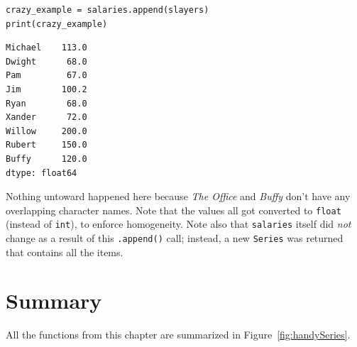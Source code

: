\begin{Verbatim}[fontsize=\small,samepage=true,frame=single,framesep=3mm]
crazy_example = salaries.append(slayers)
print(crazy_example)
\end{Verbatim}
\vspace{-.3in}

\begin{Verbatim}[fontsize=\small,samepage=true,frame=leftline,framesep=5mm,framerule=1mm]
Michael    113.0
Dwight      68.0
Pam         67.0
Jim        100.2
Ryan        68.0
Xander      72.0
Willow     200.0
Rubert     150.0
Buffy      120.0
dtype: float64
\end{Verbatim}


Nothing untoward happened here because \textit{The Office} and \textit{Buffy}
don't have any overlapping character names. Note that the values all got
converted to \texttt{float} (instead of \texttt{int}), to enforce homogeneity.
Note also that \texttt{salaries} itself did \textit{not} change as a result of
this \texttt{.append()} call; instead, a new \texttt{Series} was returned that
contains all the items.


\section{Summary}

All the functions from this chapter are summarized in
Figure~\ref{fig:handySeries}.

\setlength\extrarowheight{5pt}

